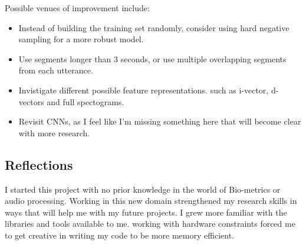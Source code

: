 \documentclass{article}
\begin{document}
Possible venues of improvement include:
\begin{itemize}
    \item Instead of building the training set randomly, consider using hard negative sampling for a more robust model.
    \item Use segments longer than 3 seconds, or use multiple overlapping segments from each utterance.
    \item Invistigate different possible feature representations. such as i-vector, d-vectors and full spectograms.
    \item Revisit CNNs, as I feel like I'm missing something here that will become clear with more research.
\end{itemize}
\subsection{Reflections}
I started this project with no prior knowledge in the world of Bio-metrics or audio processing. Working in this new domain strengthened my research skills in ways that will help me with my future projects. I grew more familiar with the libraries and tools available to me. working with hardware constraints forced me to get creative in writing my code to be more memory efficient.
\pagebreak


\end{document}
